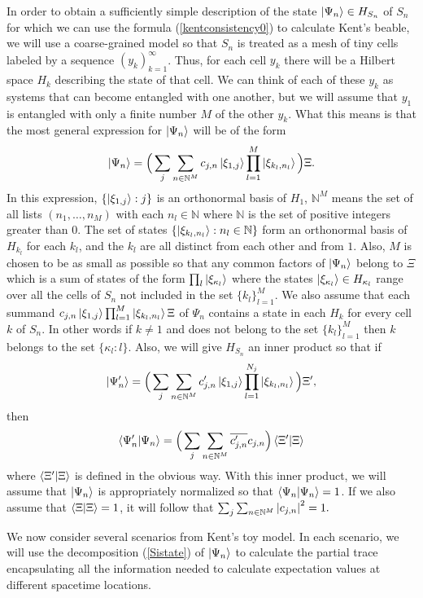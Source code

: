 In order to obtain a sufficiently simple description of the state $\ket{\Psi_n}\in H_{S_n}$ of $S_n$ for which we can use the formula (\ref{kentconsistency0}) to calculate Kent's beable, we will  
use a coarse-grained model so that $S_n$ is treated as a mesh of tiny cells labeled by a sequence $(y_k)_{k=1}^\infty$. Thus, for each cell $y_k$ there will be a Hilbert space $H_k$ describing the state of that cell. We can think of each of these $y_k$ as systems that can become entangled with one another, but we will assume that $y_1$ is entangled with only a finite number $M$ of the other $y_k$. What this means is that the most general expression for $\ket{\Psi_n}$ will be of the form
\begin{equation}\label{Sistate}
\ket{\Psi_n}=\Big(\sum_j\sum_{n\in\mathbb{N}^M} c_{j,n}\ket{\xi_{1,j}}\prod_{l=1}^{M}\ket{\xi_{k_{l},n_l}}\Big)\Xi.
\end{equation}
In this expression, $\{\ket{\xi_{1,j}}:j\}$ is an orthonormal basis of $H_1$, $\mathbb{N}^M$ means the set of all lists $(n_1,\ldots,n_M)$ with each $n_l\in\mathbb{N}$ where $\mathbb{N}$ is the set of positive integers greater than 0. The set of states $\{\ket{\xi_{k_{l},n_l}}:n_l\in\mathbb{N}\}$ form an orthonormal basis of $H_{k_{l}}$ for each $k_l$, and the $k_{l}$ are all distinct from each other and from $1$. Also, $M$ is chosen to be as small as possible so that any common factors of $\ket{\Psi_n}$ belong to $\Xi$ which is a sum of states of the form $\prod_l\ket{\xi_{\kappa_l}}$ where the states $\ket{\xi_{\kappa_l}}\in H_{\kappa_l}$ range over all the cells of $S_n$ not included in the set $\{k_{l}\}_{l=1}^M.$ We also assume that each summand $c_{j,n}\ket{\xi_{1,j}}\prod_{l=1}^{M}\ket{\xi_{k_{l},n_l}}\Xi$ of $\Psi_n$ contains a state in each $H_k$ for every cell $k$ of $S_n$. In other words if $k\neq 1$ and does not belong to the set $\{k_{l}\}_{l=1}^M$ then $k$ belongs to the set $\{\kappa_l:l\}$. Also, we will give $H_{S_n}$ an inner product so that if 
$$ \ket{\Psi_n'}=\Big(\sum_j\sum_{n\in\mathbb{N}^M} c'_{j,n}\ket{\xi_{1,j}}\prod_{l=1}^{N_j}\ket{\xi_{k_{l},n_l}}\Big)\Xi',$$ then
$$\ip{\Psi_n'}{\Psi_n}=\Big(\sum_j\sum_{n\in\mathbb{N}^M} \overline{c'_{j,n}}c_{j,n} \Big) \ip{\Xi'}{\Xi}$$
where $\ip{\Xi'}{\Xi}$ is defined in the obvious way. With this inner product, we will assume that $\ket{\Psi_n}$ is appropriately normalized so that $\ip{\Psi_n}{\Psi_n}=1$. If we also assume that  $\ip{\Xi}{\Xi}=1$, it will follow that $\sum_j\sum_{n\in\mathbb{N}^M}\abs{c_{j,n}}^2=1.$

We now consider several scenarios from Kent's toy model. In each scenario, we will use the decomposition (\ref{Sistate}) of $\ket{\Psi_n}$ to calculate the partial trace encapsulating all the information needed to calculate expectation values at different spacetime locations. 

